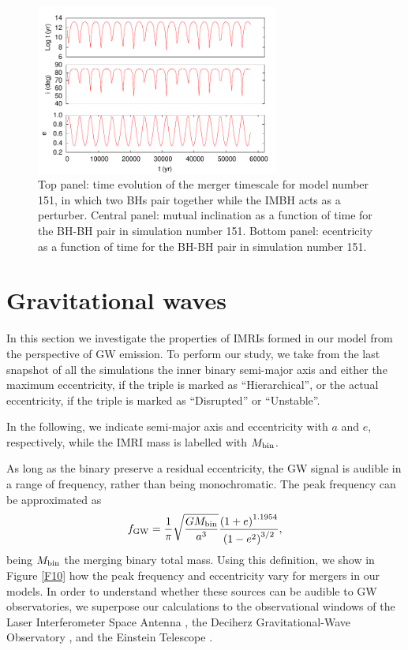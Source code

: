\documentclass[twocolumn]{aastex62}
\newcommand{\gw}{{\rm GW}}
\begin{document}
\begin{figure}
\centering 
\includegraphics[width=8cm]{kozai_151}
\caption{Top panel: time evolution of the merger timescale for model number 151, in which two BHs pair together while the IMBH acts as a perturber. Central panel: mutual inclination as a function of time for the BH-BH pair in simulation number 151. Bottom panel: ecentricity as a function of time for the BH-BH pair in simulation number 151.}
\label{F9}
\end{figure}

\section{Gravitational waves}

In this section we investigate the properties of IMRIs formed in our model from the perspective of GW emission. To perform our study, we take from the last snapshot of all the simulations the inner binary semi-major axis and either the maximum eccentricity, if the triple is marked as ``Hierarchical'', or the actual eccentricity, if the triple is marked as ``Disrupted'' or ``Unstable''.

In the following, we indicate semi-major axis and eccentricity with $a$ and $e$, respectively, while the IMRI mass is labelled with $M_{\rm bin}$.

As long as the binary preserve a residual eccentricity, the GW signal is audible in a range of frequency, rather than being monochromatic. The peak frequency can be approximated as \citep{wen03, antonini12}
\begin{equation}
f_\gw = \frac{1}{\pi}\sqrt{\frac{GM_{\rm bin}}{a^3}}\frac{\left(1+e\right)^{1.1954}}{\left(1-e^2\right)^{3/2}},
\end{equation}  
being $M_{\rm bin}$ the merging binary total mass. Using this definition, we show in Figure \ref{F10} how the peak frequency and eccentricity vary for mergers in our models. In order to understand whether these sources can be audible to GW observatories, we superpose our calculations to the observational windows of the Laser Interferometer Space Antenna \citep[LISA\footnote{\url{https://www.elisascience.org/}},][]{amaro12}, the Deciherz Gravitational-Wave Observatory \citep[DECIGO\footnote{\url{http://tamago.mtk.nao.ac.jp/spacetime/decigo_e.html}},][]{seto01}, and the Einstein Telescope \citep[ET\footnote{\url{http://www.et-gw.eu/}},][]{punturo10}. 
\end{document}
